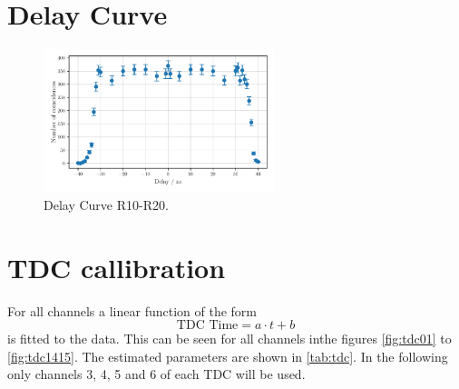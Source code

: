 \section{Delay Curve}
\begin{figure}
    \centering
    \includegraphics[width=0.6\textwidth]{plots/delay.pdf}
    \caption{Delay Curve R10-R20.}
    \label{fig:delay}
\end{figure}
\section{TDC callibration}
For all channels a linear function of the form 
\begin{equation*}
    \text{TDC Time} = a \cdot t + b
\end{equation*}
is fitted to the data. This can be seen for all channels inthe figures \ref{fig:tdc01} to
\ref{fig:tdc1415}. The estimated parameters are shown in \autoref{tab:tdc}.
In the following only channels 3, 4, 5 and 6 of each TDC will be used.


